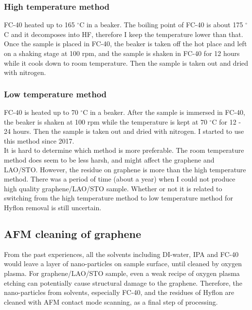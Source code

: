 \documentclass[pdflatex, sectionletters, 12pt]{pittetd}    %
\begin{document}
\subsubsection{High temperature method} FC-40 heated up to 165 $^{\circ}$C in a beaker. The boiling point of FC-40 is about 175 $^{\circ}$C and it decomposes into HF, therefore I keep the temperature lower than that. Once the sample is placed in FC-40, the beaker is taken off the hot place and left on a shaking stage at 100 rpm, and the sample is shaken in FC-40 for 12 hours while it cools down to room temperature. Then the sample is taken out and dried with nitrogen.

\subsubsection{Low temperature method} FC-40 is heated up to 70 $^{\circ}$C in a beaker. After the sample is immersed in FC-40, the beaker is shaken at 100 rpm while the temperature is kept at 70 $^{\circ}$C for 12 - 24 hours. Then the sample is taken out and dried with nitrogen. I started to use this method since 2017.
\\

It is hard to determine which method is more preferable. The room temperature method does seem to be less harsh, and might affect the graphene and LAO/STO. However, the residue on graphene is more than the high temperature method. There was a period of time (about a year) when I could not produce high quality graphene/LAO/STO sample. Whether or not it is related to switching from the high temperature method to low temperature method for Hyflon removal is still uncertain.

\subsection{AFM cleaning of graphene}

From the past experiences, all the solvents including DI-water, IPA and FC-40 would leave a layer of nano-particles on sample surface, until cleaned by oxygen plasma. For graphene/LAO/STO sample, even a weak recipe of oxygen plasma etching can potentially cause structural damage to the graphene. Therefore, the nano-particles from solvents, especially FC-40, and the residues of Hyflon are cleaned with AFM contact mode scanning, as a final step of processing. 
\end{document}
